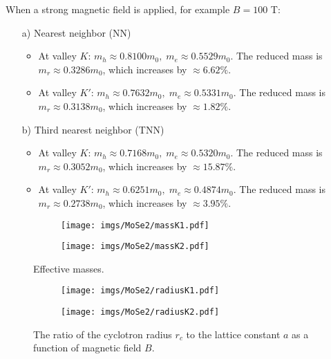 \documentclass{article}
\begin{document}
When a strong magnetic field is applied, for example $B = 100$ T:

\begin{itemize}
	\item[a)] Nearest neighbor (NN)
	      \begin{itemize}
		      \item At valley $K$: $m_{h} \approx 0.8100 m_{0},\; m_{e} \approx 0.5529 m_{0}$.
		            The reduced mass is $m_{r} \approx 0.3286 m_{0}$, which increases by $\approx 6.62\%$.

		      \item At valley $K'$: $m_{h} \approx 0.7632 m_{0},\; m_{e} \approx 0.5331 m_{0}$.
		            The reduced mass is $m_{r} \approx 0.3138 m_{0}$, which increases by $\approx 1.82\%$.
	      \end{itemize}
	\item[b)] Third nearest neighbor (TNN)
	      \begin{itemize}
		      \item At valley $K$: $m_{h} \approx 0.7168 m_{0},\; m_{e} \approx 0.5320 m_{0}$.
		            The reduced mass is $m_{r} \approx 0.3052 m_{0}$, which increases by $\approx 15.87\%$.

		      \item At valley $K'$: $m_{h} \approx 0.6251 m_{0},\; m_{e} \approx 0.4874 m_{0}$.
		            The reduced mass is $m_{r} \approx 0.2738 m_{0}$, which increases by $\approx 3.95\%$.
	      \end{itemize}
\end{itemize}

\begin{figure}[htb]
	\begin{subfigure}{0.495\textwidth}
		\centering
		\texttt{[image: imgs/MoSe2/massK1.pdf]}
	\end{subfigure}
	\begin{subfigure}{0.495\textwidth}
		\centering
		\texttt{[image: imgs/MoSe2/massK2.pdf]}
	\end{subfigure}
	\caption{Effective masses.}
\end{figure}
\begin{figure}[!h]
	\begin{subfigure}{0.495\textwidth}
		\centering
		\texttt{[image: imgs/MoSe2/radiusK1.pdf]}
	\end{subfigure}
	\begin{subfigure}{0.495\textwidth}
		\centering
		\texttt{[image: imgs/MoSe2/radiusK2.pdf]}
	\end{subfigure}
	\caption{The ratio of the cyclotron radius $r_c$ to the lattice constant $a$ as a function of magnetic field $B$.}
\end{figure}
\end{document}
